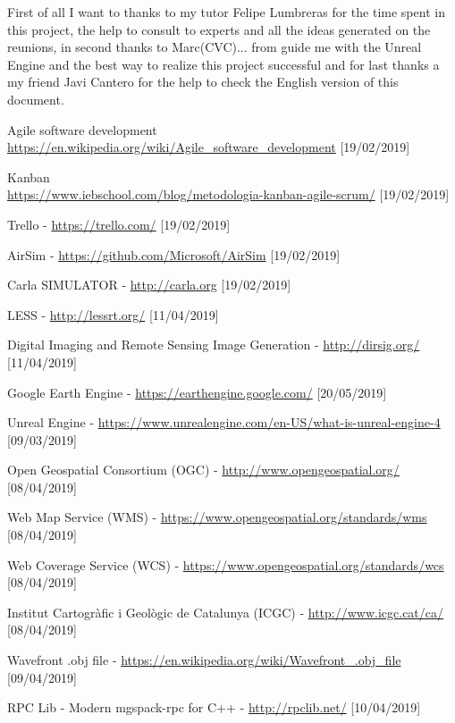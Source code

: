 \documentclass[10pt,a4paper,twocolumn,twoside]{article}
\begin{document}
First of all I want to thanks to my tutor Felipe Lumbreras for the time spent in this project, the help to consult to experts and all the ideas generated on the reunions, in second thanks to Marc(CVC)... from guide me with the Unreal Engine and the best way to realize this project successful and for last thanks a my friend Javi Cantero for the help to check the English version of this document.

\begin{thebibliography}{11}
Agile software development
\\ \url{https://en.wikipedia.org/wiki/Agile_software_development}
[19/02/2019]
 
Kanban
\\ \url{https://www.iebschool.com/blog/metodologia-kanban-agile-scrum/} [19/02/2019]

Trello - \url{https://trello.com/} [19/02/2019]

AirSim - \url{https://github.com/Microsoft/AirSim} [19/02/2019]

Carla SIMULATOR - \url{http://carla.org} [19/02/2019]

LESS - \url{http://lessrt.org/} [11/04/2019]

Digital Imaging and Remote Sensing Image Generation - \url{http://dirsig.org/} [11/04/2019]

Google Earth Engine - \url{https://earthengine.google.com/} [20/05/2019]

Unreal Engine - \url{https://www.unrealengine.com/en-US/what-is-unreal-engine-4} [09/03/2019]

Open Geospatial Consortium (OGC) -  \url{http://www.opengeospatial.org/} [08/04/2019]

Web Map Service (WMS) -  \url{https://www.opengeospatial.org/standards/wms} [08/04/2019]

Web Coverage Service (WCS) -  \url{https://www.opengeospatial.org/standards/wcs} [08/04/2019]

Institut Cartogràfic i Geològic de Catalunya (ICGC) - \url{http://www.icgc.cat/ca/} [08/04/2019]

Wavefront .obj file - \url{https://en.wikipedia.org/wiki/Wavefront_.obj_file} [09/04/2019]

RPC Lib - Modern mgspack-rpc for C++ - \url{http://rpclib.net/} [10/04/2019]


\end{thebibliography}
\end{document}
